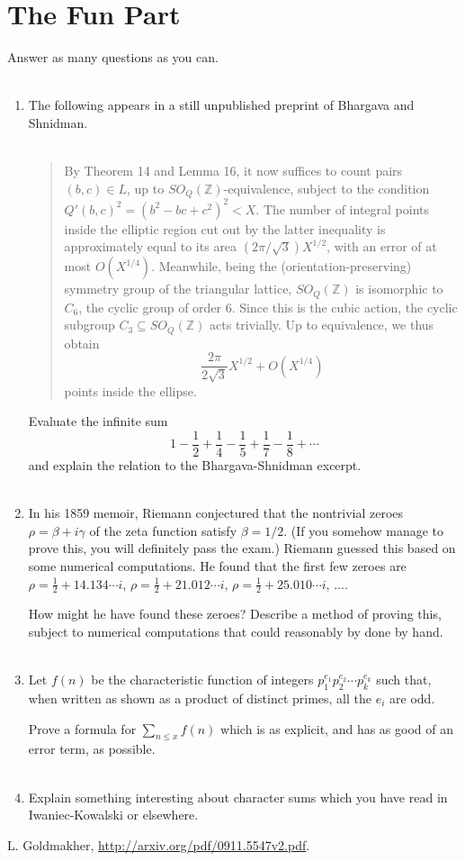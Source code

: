 \documentclass[12pt]{amsart}
\begin{document}
\section{The Fun Part}
Answer as many questions as you can.
\\
\\
\begin{enumerate}[1.]
\item
The following appears in a still unpublished preprint of Bhargava and Shnidman.
\\
\\
\begin{quote}
By Theorem 14 and Lemma 16, it now suffices to count pairs $(b, c) \in L$, up to $SO_Q(\mathbb{Z})$-equivalence,
subject to the condition $Q'(b, c)^2 = (b^2 - bc + c^2)^2 < X$. The number of integral points inside the elliptic region
cut out by the latter inequality is approximately equal to its area $(2 \pi/\sqrt{3}) X^{1/2}$, with an error of at most $O(X^{1/4})$.
Meanwhile, being the (orientation-preserving) symmetry group of the triangular lattice, $SO_Q(\mathbb{Z})$ is isomorphic to
$C_6$, the cyclic group of order $6$. Since this is the cubic action, the cyclic subgroup $C_3 \subseteq SO_Q(\mathbb{Z})$
acts trivially. Up to equivalence, we thus obtain
$$\frac{2 \pi}{2 \sqrt{3}} X^{1/2} + O(X^{1/4})$$
points inside the ellipse.
\end{quote}
\vskip 0.1in
Evaluate the infinite sum
$$1 - \frac{1}{2} + \frac{1}{4} - \frac{1}{5} + \frac{1}{7} - \frac{1}{8} + \cdots$$
and explain the relation to the Bhargava-Shnidman excerpt.
\\
\\
\item
In his 1859 memoir, Riemann conjectured that the nontrivial zeroes $\rho = \beta + i \gamma$ 
of the zeta function satisfy $\beta = 1/2$. (If you somehow manage to prove this, you will definitely pass the exam.)
Riemann guessed this based on some numerical computations. He found that the first few zeroes are
$\rho = \frac{1}{2} + 14.134\cdots i$, $\rho = \frac{1}{2} + 21.012\cdots i$, $\rho = \frac{1}{2} + 25.010\cdots i$, $\dots$.

How might he have found these zeroes? Describe a method of proving this, subject to numerical computations that
could reasonably by done by hand.
\\
\\
\vskip 0.2in
\item
Let $f(n)$ be the characteristic function of integers $p_1^{e_1} p_2^{e_2} \cdots p_k^{e_k}$ such that, when written
as shown as a product of distinct primes, all the $e_i$ are odd.

Prove a formula for $\sum_{n \leq x} f(n)$ which is as explicit, and has as good of an error term, as possible.
\\
\\
\item
Explain something interesting about character sums which you have read in Iwaniec-Kowalski or elsewhere.

\end{enumerate}
\begin{thebibliography}{99}
L. Goldmakher, \url{http://arxiv.org/pdf/0911.5547v2.pdf}.
\end{thebibliography}
\end{document}
